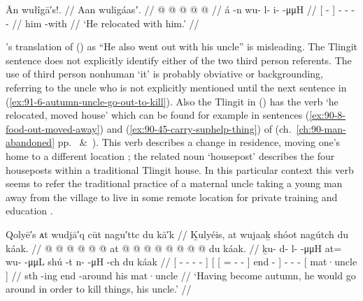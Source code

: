 \ex\label{ex:91-5-with-him-relocated}%
%
\begingl
	\glpreamble	Ān wułîgā′s!. //
	\glpreamble	Aan wuligáasʼ. //
	\gla	{}  @ {} {}  @ {} @ {} @ {} @ {} //
	\glb	{} á -n {} wu- l- i-  -μμH //
	\glc	{}[  - {}] - - -  - //
	\gld	{} him -with {}  {} {} {} {}  //
	\glft	‘He relocated with him.’
		//
\endgl
\xe

\citeauthor{swanton:1909}’s translation of (\lastx) as “He also went out with his uncle” is misleading.
The Tlingit sentence does not explicitly identify either of the two third person referents.
The use of third person nonhuman  ‘it’ is probably obviative or backgrounding, referring to the uncle who is not explicitly mentioned until the next sentence in (\ref{ex:91-6-autumn-uncle-go-out-to-kill}).
Also the Tlingit in (\lastx) has the verb  ‘he relocated, moved house’ which can be found for example in sentences (\ref{ex:90-8-food-out-moved-away}) and (\ref{ex:90-45-carry-suphelp-thing}) of  (ch.\ \ref{ch:90-man-abandoned} pp.\ \pageref{ex:90-8-food-out-moved-away} \&\ \pageref{ex:90-45-carry-suphelp-thing}).
This verb describes a change in residence, moving one’s home to a different location \parencite[cf.\ e.g.][137.1843, 185.2550]{story-naish:1973}; the related noun  ‘housepost’ describes the four houseposts within a traditional Tlingit house.
In this particular context this verb seems to refer the traditional practice of a maternal uncle taking a young man away from the village to live in some remote location for private training and education \parencites[cf.][479]{de-laguna:1972}[51]{kamenskii-kan:1985}[27]{emmons:1991}[167]{kan:2016}.

\ex\label{ex:91-6-autumn-uncle-go-out-to-kill}%
%
\begingl
	\glpreamble	Qolyē′s ᴀt wudjā′q cūt nagu′ttc du kā′k //
	\glpreamble	Ḵulyéis, at wujaaḵ shóot nagútch du káak. //
	\gla	{}  @ {} @ {} @ {} @ {} @ {} @ {} {}
		{} {} at @  @ {} @ {} @ {} {}  @ {} {}
		 @ {} @ {} @ {}
		{} du káak. {} //
	\glb	{} ḵu- {} d- l-  -μμH {} {}
		{} {} at= wu-  -μμL {} {} shú -t {}
		n-  -μH -ch
		{} du káak {} //
	\glc	{}[ - \· - -  - \· {}]
		{}[ {}[ = -  - \· {}] end - {}]
		-  - -
		{}[  mat·uncle {}] //
	\gld	{}  {} {} {} {} {} {} {}
		{} {} sth\•  {} {} -ing {} end -around {}
		 {} {} {}
		{} his mat·uncle {} //
	\glft	‘Having become autumn, he would go around in order to kill things, his uncle.’
		//
\endgl
\xe

